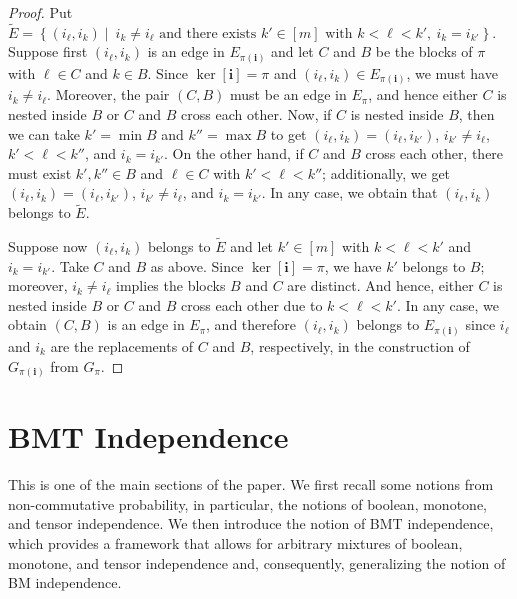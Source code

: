 \documentclass[a4paper,12pt]{extarticle}
\theoremstyle{definition}
\theoremstyle{remark}
\begin{document}
\begin{proof}
%
Put $\widetilde{E} = \left\{ (i_\ell,i_k)  \mid  \ i_k \neq i_\ell \text{ and there exists } k' \in [m] \text{ with }k < \ell < k', \ i_k = i_{k'} 	\right\} $. 
%
Suppose first $(i_\ell,i_k)$ is an edge in $E_{\pi({\bm i})}$ and let $C$ and $B$ be the blocks of $\pi$ with $ \ell \in C $ and $k \in B$. 
%
Since $\ker[\bm{i}] = \pi$ and $(i_\ell,i_k) \in E_{\pi({\bm i})}$, we must have $i_k \neq i_\ell$. 
%
Moreover, the pair $(C,B)$ must be an edge in $E_\pi$, and hence either $C$ is nested inside $B$ or $C$ and $B$ cross each other. 
%
Now, if $C$ is nested inside $B$, then we can take $k' = \min B$ and $k''= \max B$ to get  $(i_\ell,i_k) = (i_\ell,i_{k'})$,  $i_{k'} \neq i_\ell$, $k' < \ell < k''$, and $i_k = i_{k'}$. 
%
On the other hand, if $C$ and $B$ cross each other, there must exist $k',k'' \in B$ and $\ell \in C$ with $k' < \ell < k''$; additionally, we get $(i_\ell,i_k) = (i_\ell,i_{k'})$, $i_{k'} \neq i_\ell$, and $i_k = i_{k'}$. 
%
In any case, we obtain that $(i_\ell,i_k)$ belongs to $\widetilde{E}$. 
%
%
%


Suppose now $(i_\ell,i_k)$ belongs to $\widetilde{E}$ and let $k' \in [m]$ with $k < \ell < k'$ and $i_k = i_{k'}$. 
%
Take $C$ and $B$ as above. 
%
Since $\ker[\bm{i}] = \pi$, we have $k'$ belongs to $B$; moreover, $i_k \neq i_\ell$ implies the blocks  $B$ and $C$ are distinct. 
%
And hence,  either $C$ is nested inside $B$ or $C$ and $B$ cross each other due to $k < \ell < k'$.  
%
In any case, we obtain $(C,B)$ is an edge in $E_\pi$, and therefore $(i_\ell,i_k)$ belongs to $E_{\pi(\bm{i})}$ since $i_\ell$ and $i_k$ are the replacements of $C$ and $B$, respectively, in the construction of $G_{\pi(\bm{i})}$ from $G_\pi$. 
%
\end{proof}








\section{BMT Independence}
%
This is one of the main sections of the paper. 
%
We first recall some notions from non-commutative probability, in particular, the notions of boolean, monotone, and tensor independence. 
% 
We then introduce the notion of BMT independence, which provides a framework that allows for arbitrary mixtures of boolean, monotone, and tensor independence and, consequently, generalizing the notion of BM independence. 
%
%
%
%
%
%
\end{document}
